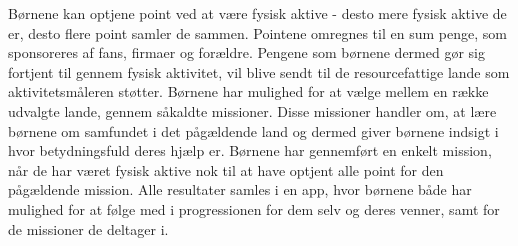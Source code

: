 Børnene kan optjene point ved at være fysisk aktive - desto mere fysisk aktive de er, desto flere point samler de sammen. Pointene omregnes til en sum penge, som sponsoreres af fans, firmaer og forældre. Pengene som børnene dermed gør sig fortjent til gennem fysisk aktivitet, vil blive sendt til de resourcefattige lande som aktivitetsmåleren støtter. \newline
Børnene har mulighed for at vælge mellem en række udvalgte lande, gennem såkaldte missioner. Disse missioner handler om, at lære børnene om samfundet i det pågældende land og dermed giver børnene indsigt i hvor betydningsfuld deres hjælp er. Børnene har gennemført en enkelt mission, når de har været fysisk aktive nok til at have optjent alle point for den pågældende mission. \newline
Alle resultater samles i en app, hvor børnene både har mulighed for at følge med i progressionen for dem selv og deres venner, samt for de missioner de deltager i. \citep{PowerAbout2015, PowerManuel2015}



